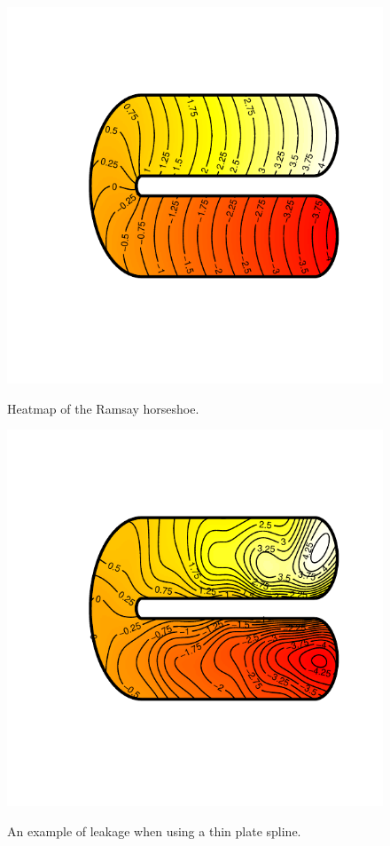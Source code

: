 \documentclass[a4paper,10pt]{amsart}
\begin{document}
\begin{figure}
\centering
\includegraphics[trim=1.5in 1in 0.5in 1in]{figs/ramsayhorseshoe.pdf} \\
\caption{Heatmap of the Ramsay horseshoe.}
\label{ramsayshorseshoe}
\end{figure}

\begin{figure}
\centering
\includegraphics[trim=1.5in 1in 0.5in 1in]{figs/leakageexample.pdf} \\
\caption{An example of leakage when using a thin plate spline.}
\label{tpleakage}
\end{figure}
\end{document}
